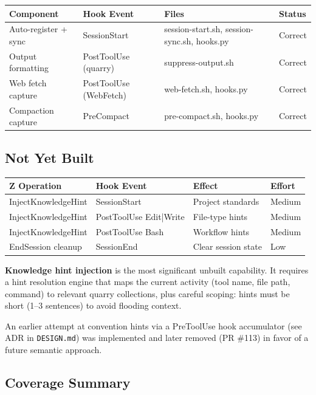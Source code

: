 \documentclass[a4paper,10pt,fleqn]{article}
\begin{document}
{\small
\begin{tabular}{lp{3cm}p{5cm}l}
\hline
\textbf{Component} & \textbf{Hook Event} & \textbf{Files} &
  \textbf{Status} \\
\hline
Auto-register + sync & SessionStart &
  session-start.sh, session-sync.sh, hooks.py & Correct \\
Output formatting & PostToolUse (quarry) &
  suppress-output.sh & Correct \\
Web fetch capture & PostToolUse (WebFetch) &
  web-fetch.sh, hooks.py & Correct \\
Compaction capture & PreCompact &
  pre-compact.sh, hooks.py & Correct \\
\hline
\end{tabular}
}

\subsection{Not Yet Built}

\begin{tabular}{llll}
\hline
\textbf{Z Operation} & \textbf{Hook Event} & \textbf{Effect} & \textbf{Effort} \\
\hline
InjectKnowledgeHint & SessionStart & Project standards & Medium \\
InjectKnowledgeHint & PostToolUse Edit|Write & File-type hints & Medium \\
InjectKnowledgeHint & PostToolUse Bash & Workflow hints & Medium \\
EndSession cleanup & SessionEnd & Clear session state & Low \\
\hline
\end{tabular}

\textbf{Knowledge hint injection} is the most significant unbuilt
capability.  It requires a hint resolution engine that maps the
current activity (tool name, file path, command) to relevant quarry
collections, plus careful scoping: hints must be short (1--3
sentences) to avoid flooding context.

An earlier attempt at convention hints via a PreToolUse hook
accumulator (see ADR in \texttt{DESIGN.md}) was implemented and
later removed (PR \#113) in favor of a future semantic approach.

\subsection{Coverage Summary}
\end{document}
